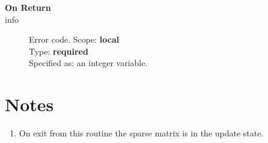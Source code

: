\begin{description}
\item[\bf On Return]
\item[info] Error code.
Scope: {\bf local} \\
Type: {\bf required}\\
Specified as: an integer variable.
\end{description}
\section*{Notes}
\begin{enumerate}
\item On exit from this routine the sparse matrix is in the update
  state. 
\end{enumerate}
%
%





